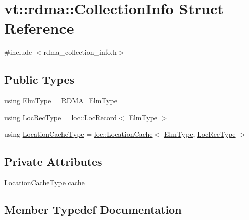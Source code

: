 \hypertarget{structvt_1_1rdma_1_1_collection_info}{}\section{vt\+:\+:rdma\+:\+:Collection\+Info Struct Reference}
\label{structvt_1_1rdma_1_1_collection_info}


{\ttfamily \#include $<$rdma\+\_\+collection\+\_\+info.\+h$>$}

\subsection*{Public Types}
\begin{DoxyCompactItemize}
\item 
using \hyperlink{structvt_1_1rdma_1_1_collection_info_a31cd8d00263f9260a6ca3d8e5cbc19e8}{Elm\+Type} = \hyperlink{namespacevt_a2c2a902092b72056f70210c159f966f0}{R\+D\+M\+A\+\_\+\+Elm\+Type}
\item 
using \hyperlink{structvt_1_1rdma_1_1_collection_info_ad1cd4adc9c3afc0f9fb472033423ee4b}{Loc\+Rec\+Type} = \hyperlink{structvt_1_1location_1_1_loc_record}{loc\+::\+Loc\+Record}$<$ \hyperlink{structvt_1_1rdma_1_1_collection_info_a31cd8d00263f9260a6ca3d8e5cbc19e8}{Elm\+Type} $>$
\item 
using \hyperlink{structvt_1_1rdma_1_1_collection_info_a25a687ebde2ae64ae23dd9a7216071be}{Location\+Cache\+Type} = \hyperlink{structvt_1_1location_1_1_location_cache}{loc\+::\+Location\+Cache}$<$ \hyperlink{structvt_1_1rdma_1_1_collection_info_a31cd8d00263f9260a6ca3d8e5cbc19e8}{Elm\+Type}, \hyperlink{structvt_1_1rdma_1_1_collection_info_ad1cd4adc9c3afc0f9fb472033423ee4b}{Loc\+Rec\+Type} $>$
\end{DoxyCompactItemize}
\subsection*{Private Attributes}
\begin{DoxyCompactItemize}
\item 
\hyperlink{structvt_1_1rdma_1_1_collection_info_a25a687ebde2ae64ae23dd9a7216071be}{Location\+Cache\+Type} \hyperlink{structvt_1_1rdma_1_1_collection_info_ae929d6028b34287f845cbe5a2ca56bd4}{cache\+\_\+}
\end{DoxyCompactItemize}


\subsection{Member Typedef Documentation}
\mbox{\label{structvt_1_1rdma_1_1_collection_info_a31cd8d00263f9260a6ca3d8e5cbc19e8}} 
